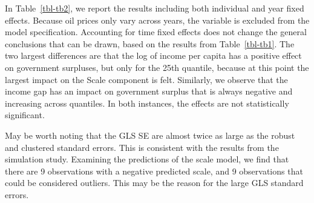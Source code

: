 \documentclass[
  12pt,
  oneside]{article}
\begin{document}
In Table~\ref{tbl-tb2}, we report the results including both individual
and year fixed effects. Because oil prices only vary across years, the
variable is excluded from the model specification. Accounting for time
fixed effects does not change the general conclusions that can be drawn,
based on the results from Table~\ref{tbl-tb1}. The two largest
differences are that the log of income per capita has a positive effect
on government surpluses, but only for the 25th quantile, because at this
point the largest impact on the Scale component is felt. Similarly, we
observe that the income gap has an impact on government surplus that is
always negative and increasing across quantiles. In both instances, the
effects are not statistically significant.

May be worth noting that the GLS SE are almost twice as large as the
robust and clustered standard errors. This is consistent with the
results from the simulation study. Examining the predictions of the
scale model, we find that there are 9 observations with a negative
predicted scale, and 9 observations that could be considered outliers.
This may be the reason for the large GLS standard errors.
\end{document}
